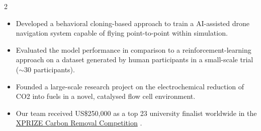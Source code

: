 \documentclass[10pt,a4paper,ragged2e]{altacv}
\begin{document}
\begin{paracol}{2}
	\divider

	\begin{itemize}
		\item Developed a behavioral cloning-based approach to train a AI-assisted drone navigation system capable of flying point-to-point within simulation.
		\item Evaluated the model performance in comparison to a reinforcement-learning approach on a dataset generated by human participants in a small-scale trial ($\sim$30 participants).
	\end{itemize}

	\divider

	\begin{itemize}
		\item Founded a large-scale research project on the electrochemical reduction of CO2 into fuels in a novel, catalysed flow cell environment.
		\item Our team received US\$250,000 as a top 23 university finalist worldwide in the \href{https://www.xprize.org/prizes/carbonremoval}{XPRIZE Carbon Removal Competition} \faLink.
	\end{itemize}

\end{paracol}
\end{document}
